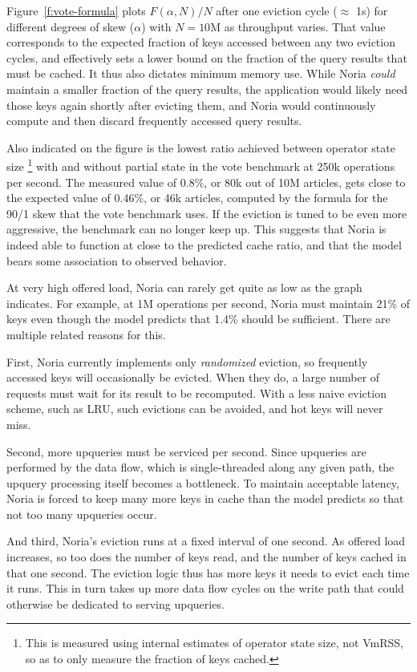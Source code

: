 Figure~\ref{f:vote-formula} plots $F(\alpha, N)/N$ after one eviction cycle
($\approx$ 1s) for different degrees of skew ($\alpha$) with $N=10\text{M}$ as
throughput varies. That value corresponds to the expected fraction of keys
accessed between any two eviction cycles, and effectively sets a lower bound on
the fraction of the query results that must be cached. It thus also dictates
minimum memory use. While Noria \emph{could} maintain a smaller fraction of the
query results, the application would likely need those keys again shortly after
evicting them, and Noria would continuously compute and then discard frequently
accessed query results.

Also indicated on the figure is the lowest ratio achieved between operator state
size%
\footnote{This is measured using internal estimates of operator state size, not
VmRSS, so as to only measure the fraction of keys cached.}
with and without partial state in the vote benchmark at 250k operations per
second. The measured value of 0.8\%, or 80k out of 10M articles, gets close to
the expected value of 0.46\%, or 46k articles, computed by the formula for the
90/1 skew that the vote benchmark uses. If the eviction is tuned to be even more
aggressive, the benchmark can no longer keep up. This suggests that Noria is
indeed able to function at close to the predicted cache ratio, and that the
model bears some association to observed behavior.

At very high offered load, Noria can rarely get quite as low as the graph
indicates. For example, at 1M operations per second, Noria must maintain 21\% of
keys even though the model predicts that 1.4\% should be sufficient. There are
multiple related reasons for this.

First, Noria currently implements only \emph{randomized} eviction, so frequently
accessed keys will occasionally be evicted. When they do, a large number of
requests must wait for its result to be recomputed. With a less naive eviction
scheme, such as LRU, such evictions can be avoided, and hot keys will never
miss.

Second, more upqueries must be serviced per second. Since upqueries are
performed by the data flow, which is single-threaded along any given path, the
upquery processing itself becomes a bottleneck. To maintain acceptable latency,
Noria is forced to keep many more keys in cache than the model predicts so that
not too many upqueries occur.

And third, Noria's eviction runs at a fixed interval of one second. As offered
load increases, so too does the number of keys read, and the number of keys
cached in that one second. The eviction logic thus has more keys it needs to
evict each time it runs. This in turn takes up more data flow cycles on the
write path that could otherwise be dedicated to serving upqueries.
